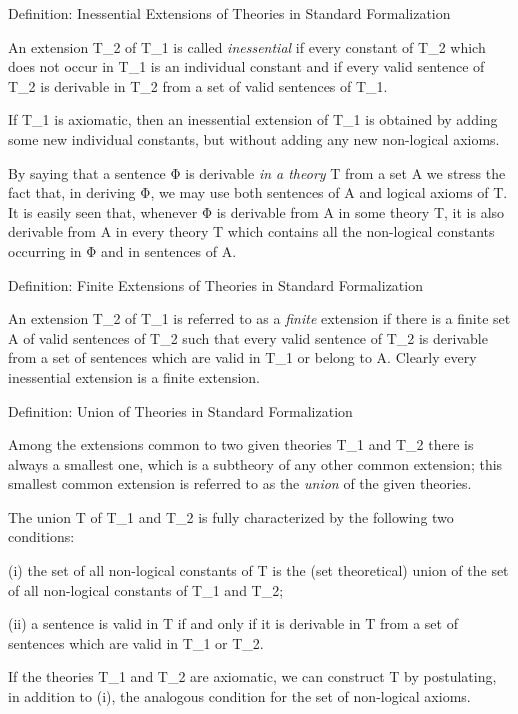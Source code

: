 \protect\hypertarget{anchor-32}{}{}Definition: Inessential Extensions of
Theories in Standard Formalization

An extension T\_2 of T\_1 is called \emph{inessential} if every constant
of T\_2 which does not occur in T\_1 is an individual constant and if
every valid sentence of T\_2 is derivable in T\_2 from a set of valid
sentences of T\_1.

If T\_1 is axiomatic, then an inessential extension of T\_1 is obtained
by adding some new individual constants, but without adding any new
non-logical axioms.

By saying that a sentence Φ is derivable \emph{in a theory} T from a set
A we stress the fact that, in deriving Φ, we may use both sentences of A
and logical axioms of T. It is easily seen that, whenever Φ is derivable
from A in some theory T, it is also derivable from A in every theory
T\textquotesingle{} which contains all the non-logical constants
occurring in Φ and in sentences of A.

\protect\hypertarget{anchor-33}{}{}Definition: Finite Extensions of
Theories in Standard Formalization

An extension T\_2 of T\_1 is referred to as a \emph{finite} extension if
there is a finite set A of valid sentences of T\_2 such that every valid
sentence of T\_2 is derivable from a set of sentences which are valid in
T\_1 or belong to A. Clearly every inessential extension is a finite
extension.

\protect\hypertarget{anchor-34}{}{}Definition: Union of Theories in
Standard Formalization

Among the extensions common to two given theories T\_1 and T\_2 there is
always a smallest one, which is a subtheory of any other common
extension; this smallest common extension is referred to as the
\emph{union} of the given theories.

The union T of T\_1 and T\_2 is fully characterized by the following two
conditions:

(i) the set of all non-logical constants of T is the (set theoretical)
union of the set of all non-logical constants of T\_1 and T\_2;

(ii) a sentence is valid in T if and only if it is derivable in T from a
set of sentences which are valid in T\_1 or T\_2.

If the theories T\_1 and T\_2 are axiomatic, we can construct T by
postulating, in addition to (i), the analogous condition for the set of
non-logical axioms.

